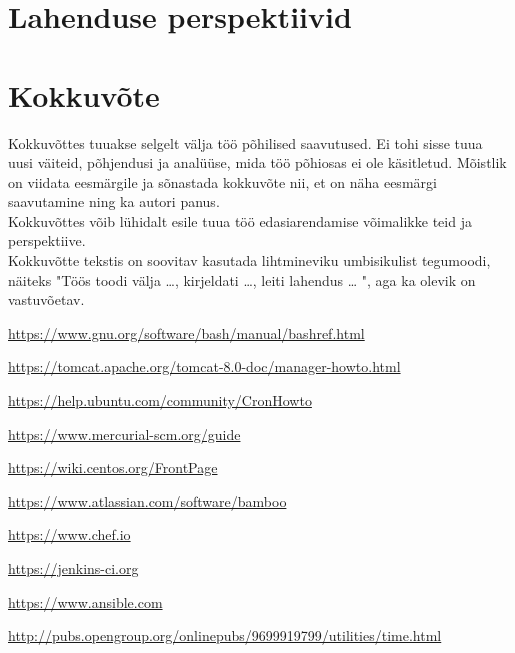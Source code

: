 \documentclass[12pt]{report}
\begin{document}
  
  \section{Lahenduse perspektiivid}
  
  \newpage
  
  \section*{Kokkuvõte}
  \label{kokkuvote}

Kokkuvõttes tuuakse selgelt välja töö põhilised saavutused. Ei tohi sisse tuua uusi väiteid, põhjendusi ja analüüse, mida töö põhiosas ei ole käsitletud. Mõistlik on viidata eesmärgile ja sõnastada kokkuvõte nii, et on näha eesmärgi saavutamine ning ka autori panus.\\

Kokkuvõttes võib lühidalt esile tuua töö edasiarendamise võimalikke teid ja perspektiive.\\

Kokkuvõtte tekstis on soovitav kasutada lihtmineviku umbisikulist tegumoodi, näiteks "Töös toodi välja …, kirjeldati …, leiti lahendus … ", aga ka olevik on vastuvõetav.

  \newpage
  
  \begin{thebibliography}{9}
    \label{kasutatud-materjalid}
  
    \url{https://www.gnu.org/software/bash/manual/bashref.html}
    
    \url{https://tomcat.apache.org/tomcat-8.0-doc/manager-howto.html}
  
    \url{https://help.ubuntu.com/community/CronHowto}
  
    \url{https://www.mercurial-scm.org/guide}
  
    \url{https://wiki.centos.org/FrontPage}
  
    \url{https://www.atlassian.com/software/bamboo}
  
    \url{https://www.chef.io}
  
    \url{https://jenkins-ci.org}
  
    \url{https://www.ansible.com}
    
    \url{http://pubs.opengroup.org/onlinepubs/9699919799/utilities/time.html}
 
  \end{thebibliography}
\end{document}
